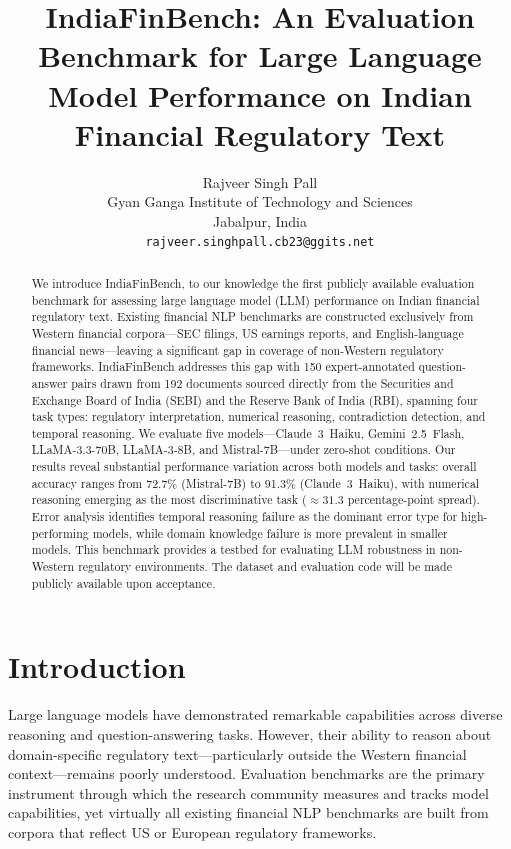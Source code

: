\documentclass[11pt]{article}
\title{\textbf{IndiaFinBench: An Evaluation Benchmark for Large Language Model
Performance on Indian Financial Regulatory Text}}
\author{
  Rajveer Singh Pall \\
  Gyan Ganga Institute of Technology and Sciences \\
  Jabalpur, India \\
  \texttt{rajveer.singhpall.cb23@ggits.net}
}
\date{}
\begin{document}
\maketitle

\begin{abstract}
We introduce IndiaFinBench, to our knowledge the first publicly available
evaluation benchmark for assessing large language model (LLM) performance on
Indian financial regulatory text. Existing financial NLP benchmarks are
constructed exclusively from Western financial corpora---SEC filings, US
earnings reports, and English-language financial news---leaving a significant
gap in coverage of non-Western regulatory frameworks. IndiaFinBench addresses
this gap with 150 expert-annotated question-answer pairs drawn from 192
documents sourced directly from the Securities and Exchange Board of India
(SEBI) and the Reserve Bank of India (RBI), spanning four task types:
regulatory interpretation, numerical reasoning, contradiction detection, and
temporal reasoning. We evaluate five models---Claude~3~Haiku,
Gemini~2.5~Flash, LLaMA-3.3-70B, LLaMA-3-8B, and Mistral-7B---under
zero-shot conditions. Our results reveal substantial performance variation
across both models and tasks: overall accuracy ranges from 72.7\%
(Mistral-7B) to 91.3\% (Claude~3~Haiku), with numerical reasoning emerging
as the most discriminative task (${\approx}31.3$ percentage-point spread).
Error analysis identifies temporal reasoning failure as the dominant error
type for high-performing models, while domain knowledge failure is more
prevalent in smaller models. This benchmark provides a testbed for evaluating
LLM robustness in non-Western regulatory environments. The dataset and
evaluation code will be made publicly available upon acceptance.
\end{abstract}

\section{Introduction}

Large language models have demonstrated remarkable capabilities across diverse
reasoning and question-answering tasks. However, their ability to reason about
domain-specific regulatory text---particularly outside the Western financial
context---remains poorly understood. Evaluation benchmarks are the primary
instrument through which the research community measures and tracks model
capabilities, yet virtually all existing financial NLP benchmarks are built
from corpora that reflect US or European regulatory frameworks.
\end{document}
